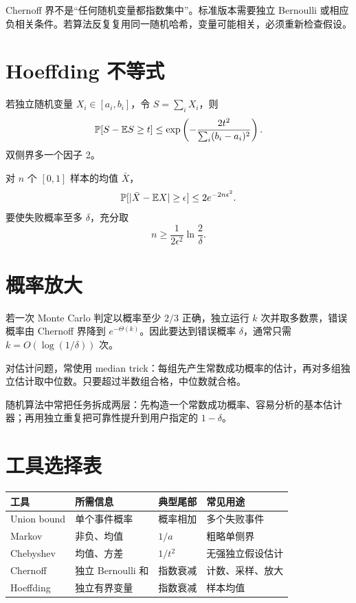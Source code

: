 \begin{warningbox}
Chernoff 界不是“任何随机变量都指数集中”。标准版本需要独立 Bernoulli 或相应负相关条件。若算法反复复用同一随机哈希，变量可能相关，必须重新检查假设。
\end{warningbox}

\section{Hoeffding 不等式}

\begin{theorem}[Hoeffding]
若独立随机变量 $X_i\in[a_i,b_i]$，令 $S=\sum_iX_i$，则
\[
\mathbb{P}[S-\mathbb{E} S\ge t]
\le\exp\left(-\frac{2t^2}{\sum_i(b_i-a_i)^2}\right).
\]
双侧界多一个因子 2。
\end{theorem}

对 $n$ 个 $[0,1]$ 样本的均值 $\bar X$，
\[
\mathbb{P}[|\bar X-\mathbb{E} X|\ge\epsilon]
\le2e^{-2n\epsilon^2}.
\]
要使失败概率至多 $\delta$，充分取
\[
n\ge\frac{1}{2\epsilon^2}\ln\frac2\delta.
\]

\section{概率放大}

若一次 Monte Carlo 判定以概率至少 $2/3$ 正确，独立运行 $k$ 次并取多数票，错误概率由 Chernoff 界降到 $e^{-\Theta(k)}$。因此要达到错误概率 $\delta$，通常只需 $k=O(\log(1/\delta))$ 次。

对估计问题，常使用 median trick：每组先产生常数成功概率的估计，再对多组独立估计取中位数。只要超过半数组合格，中位数就合格。

\begin{intuitionbox}
随机算法中常把任务拆成两层：先构造一个常数成功概率、容易分析的基本估计器；再用独立重复把可靠性提升到用户指定的 $1-\delta$。
\end{intuitionbox}

\section{工具选择表}

\begin{center}
\begin{tabularx}{\textwidth}{lXXX}
\toprule
工具 & 所需信息 & 典型尾部 & 常见用途\\
\midrule
Union bound & 单个事件概率 & 概率相加 & 多个失败事件\\
Markov & 非负、均值 & $1/a$ & 粗略单侧界\\
Chebyshev & 均值、方差 & $1/t^2$ & 无强独立假设估计\\
Chernoff & 独立 Bernoulli 和 & 指数衰减 & 计数、采样、放大\\
Hoeffding & 独立有界变量 & 指数衰减 & 样本均值\\
\bottomrule
\end{tabularx}
\end{center}

